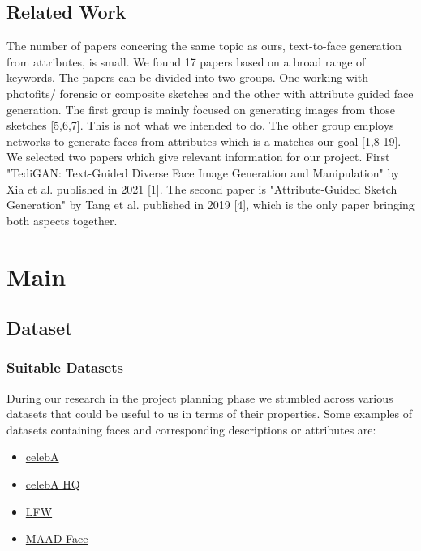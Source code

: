\documentclass[12pt, a4paper]{article}
\begin{document}
\subsection{Related Work}
The number of papers concering the same topic as ours, text-to-face generation from attributes, is small. We found 17 papers based on a broad range of keywords. 
The papers can be divided into two groups. One working with photofits/ forensic or composite sketches and the other with attribute guided face generation.
The first group is mainly focused on generating images from those sketches [5,6,7]. This is not what we intended to do. 
The other group employs networks to generate faces from attributes which is a matches our goal [1,8-19].
We selected two papers which give relevant information for our project. First "TediGAN: Text-Guided Diverse Face Image Generation and Manipulation" by Xia et al. published in 2021 [1]. The second paper is "Attribute-Guided Sketch Generation" by Tang et al. published in 2019 [4], which is the only paper bringing both aspects together.

\section{Main}
\subsection{Dataset}
\subsubsection{Suitable Datasets}\label{SuitableDatasets}
During our research in the project planning phase we stumbled across various datasets that could be useful to us in
terms of their properties. Some examples of datasets containing faces and corresponding descriptions or attributes are:
\begin{itemize}
    \item \href{https://mmlab.ie.cuhk.edu.hk/projects/CelebA.html}{celebA}
    \item \href{http://mmlab.ie.cuhk.edu.hk/projects/CelebA/CelebAMask_HQ.html#:~:text=CelebAMask\%2DHQ\%20is\%20a\%20large,facial\%20attributes\%20corresponding\%20to\%20CelebA}{celebA HQ}
    \item \href{http://vis-www.cs.umass.edu/lfw/}{LFW}
    \item \href{https://github.com/pterhoer/MAAD-Face}{MAAD-Face}
\end{itemize}
\end{document}
